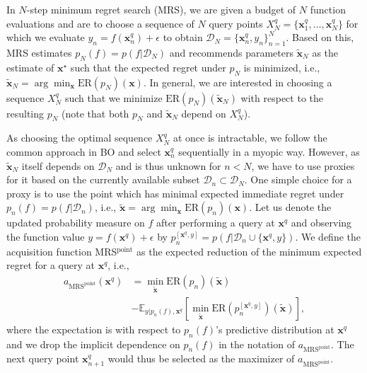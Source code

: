 \documentclass[10pt,letterpaper]{article} %
\begin{document}
In $N$-step minimum regret search (MRS), we are given a budget of $N$ function evaluations and are to choose a sequence of $N$ query points
$X^q_N=\{\mathbf{x}^q_1, \dots, \mathbf{x}^q_N\}$ for which we evaluate $y_n = f(\mathbf{x}^q_n) +
\epsilon$ to obtain $\mathcal{D}_N = \{\mathbf{x}^q_n, y_n\}_{n=1}^N$. Based on this, MRS
estimates $p_N(f) = p(f \vert \mathcal{D}_N)$  and recommends parameters
$\mathbf{\tilde x}_N$ as the estimate of $\mathbf{x}^\star$ such that the
expected regret under $p_N$ is minimized, i.e., $\mathbf{\tilde x}_N = \arg\min_\mathbf{x}
\text{ER}(p_N)(\mathbf{x})$.
 In general, we are interested in choosing a
sequence $X^q_N$ such that we minimize
$\text{ER}(p_N)(\mathbf{\tilde x}_N)$ with respect to the resulting $p_N$ (note that both $p_N$ and $\mathbf{\tilde x}_N$ depend on $X^q_N$).

As choosing the optimal sequence $X^q_N$ at once is intractable, we follow the
common approach in BO and select $\mathbf{x}^q_n$
sequentially in a myopic way. However, as $\mathbf{\tilde x}_N$ itself depends
on $\mathcal{D}_N$ and is thus unknown for $n < N$, we have to use proxies for it based on the currently
available subset $\mathcal{D}_n \subset \mathcal{D}_N$.  One simple choice for a proxy is to use
the point which has minimal expected immediate regret under $p_n(f) =
p(f \vert \mathcal{D}_n)$, i.e.,
$\mathbf{\tilde x} = \arg\min_\mathbf{x} \text{ER}(p_n)(\mathbf{x})$.
Let us denote the updated
probability measure on $f$ after performing a query at $\mathbf{x}^q$ and
observing the function value $y=f(\mathbf{x}^q) + \epsilon$ by
$p^{[\mathbf{x}^q, y]}_n = p(f\vert \mathcal{D}_n \cup \{\mathbf{x}^q, y\})$.
We define the acquisition function MRS$^{\text{point}}$ as the expected reduction of the minimum expected regret for a query at
$\mathbf{x}^q$, i.e.,
\begin{equation*}
\begin{split}
a_{\text{MRS}^{\text{point}}}(\mathbf{x}^q)
    & = \min_{\mathbf{\tilde x}}\text{ER}(p_n)(\mathbf{\tilde x}) \\
     &- \mathbb{E}_{y \vert p_n(f), \mathbf{x}^q}[\min_{\mathbf{\tilde x}}  \text{ER}(p^{[\mathbf{x}^q, y]}_n)(\mathbf{\tilde x})],
\end{split}
\end{equation*}
where the expectation is with
respect to $p_n(f)$'s predictive distribution at $\mathbf{x}^q$ and we drop the
implicit dependence on $p_n(f)$ in the notation of $a_{\text{MRS}^{\text{point}}}$.
The next query point $\mathbf{x}^q_{n+1}$ would thus be selected as the maximizer of
$a_{\text{MRS}^{\text{point}}}$.
\end{document}

